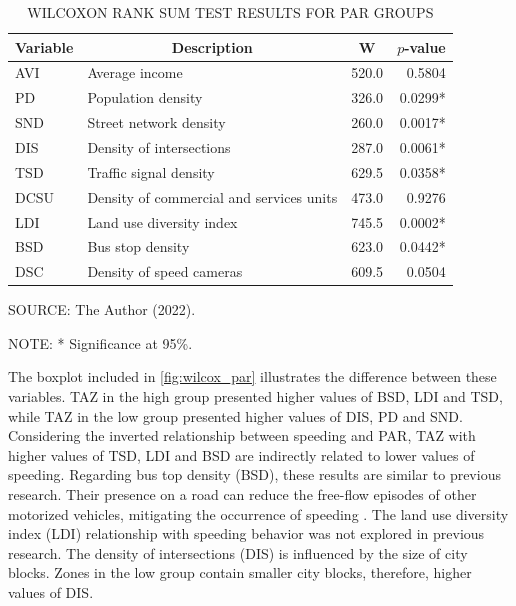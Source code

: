 \begin{table}
    \footnotesize
    \captionsetup{justification=raggedright,
        singlelinecheck=false,
        font=footnotesize}
    \caption{WILCOXON RANK SUM TEST RESULTS FOR PAR GROUPS}
    \centering
    \begin{tabular}{llrr}
        \hline
        \multicolumn{1}{c}{\textbf{Variable}} & \multicolumn{1}{c}{\textbf{Description}} & \multicolumn{1}{c}{\textbf{W}} & \multicolumn{1}{c}{\textbf{$p$-value}} \\
        \hline
        AVI  & Average income                           & 520.0 & 0.5804  \\
        PD   & Population density                       & 326.0 & 0.0299* \\
        SND  & Street network density                   & 260.0 & 0.0017* \\
        DIS  & Density of intersections                 & 287.0 & 0.0061* \\
        TSD  & Traffic signal density                   & 629.5 & 0.0358* \\
        DCSU & Density of commercial and services units & 473.0 & 0.9276  \\
        LDI  & Land use diversity index                 & 745.5 & 0.0002* \\
        BSD  & Bus stop density                         & 623.0 & 0.0442* \\
        DSC  & Density of speed cameras                 & 609.5 & 0.0504  \\
        \hline
    \end{tabular}
    \label{tab:wilcox_par}
    \par \vspace{2mm} \footnotesize \raggedright
    SOURCE: The Author (2022).
    \par
    NOTE: * Significance at 95\%.
\end{table}

The boxplot included in \autoref{fig:wilcox_par} illustrates the difference between these variables. TAZ in the high group presented higher values of BSD, LDI and TSD, while TAZ in the low group presented higher values of DIS, PD and SND. Considering the inverted relationship between speeding and PAR, TAZ with higher values of TSD, LDI and BSD are indirectly related to lower values of speeding. Regarding bus top density (BSD), these results are similar to previous research. Their presence on a road can reduce the free-flow episodes of other motorized vehicles, mitigating the occurrence of speeding \cite{Bansal2014,Koshy2005}. The land use diversity index (LDI) relationship with speeding behavior was not explored in previous research. The density of intersections (DIS) is influenced by the size of city blocks. Zones in the low group contain smaller city blocks, therefore, higher values of DIS. 

